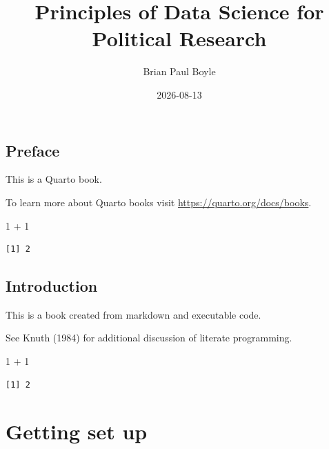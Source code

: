 \documentclass[
  letterpaper,
  DIV=11,
  numbers=noendperiod]{scrreprt}
\title{Principles of Data Science for Political Research}
\author{Brian Paul Boyle}
\date{2026-08-13}
\newenvironment{Shaded}{\begin{snugshade}}{\end{snugshade}}
\newcommand{\DecValTok}[1]{\textcolor[rgb]{0.68,0.00,0.00}{#1}}
\newcommand{\SpecialCharTok}[1]{\textcolor[rgb]{0.37,0.37,0.37}{#1}}
\renewcommand*\contentsname{Table of contents}
\newcommand\contentsname{Table of contents}
\begin{document}
\maketitle

\renewcommand*\contentsname{Table of contents}
{
\setcounter{tocdepth}{2}
\tableofcontents
}


\chapter*{Preface}\label{preface}


This is a Quarto book.

To learn more about Quarto books visit
\url{https://quarto.org/docs/books}.

\begin{Shaded}
\begin{Highlighting}[]
\DecValTok{1} \SpecialCharTok{+} \DecValTok{1}
\end{Highlighting}
\end{Shaded}

\begin{verbatim}
[1] 2
\end{verbatim}


\chapter{Introduction}\label{introduction}

This is a book created from markdown and executable code.

See Knuth (1984) for additional discussion of literate programming.

\begin{Shaded}
\begin{Highlighting}[]
\DecValTok{1} \SpecialCharTok{+} \DecValTok{1}
\end{Highlighting}
\end{Shaded}

\begin{verbatim}
[1] 2
\end{verbatim}

\part{Getting set up}
\end{document}
